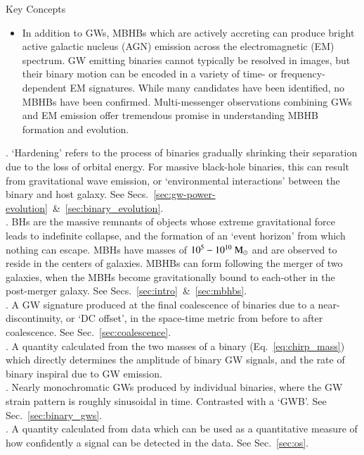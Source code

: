 \documentclass[onecolumn,authoryear]{els-mrw}
\begin{document}
\begin{BoxTypeA}{Key Concepts}
\begin{itemize}
    \item In addition to GWs, MBHBs which are actively accreting can produce bright active galactic nucleus (AGN) emission across the electromagnetic (EM) spectrum.  GW emitting binaries cannot typically be resolved in images, but their binary motion can be encoded in a variety of time- or frequency- dependent EM signatures.  While many candidates have been identified, no MBHBs have been confirmed.  Multi-messenger observations combining GWs and EM emission offer tremendous promise in understanding MBHB formation and evolution.
\end{itemize}
\end{BoxTypeA}


\begin{glossary}[Glossary]
    .  `Hardening' refers to the process of binaries gradually shrinking their separation due to the loss of orbital energy.  For massive black-hole binaries, this can result from gravitational wave emission, or `environmental interactions' between the binary and host galaxy. See Secs.~\ref{sec:gw-power-evolution}~\&~\ref{sec:binary_evolution}. \\
    .  BHs are the massive remnants of objects whose extreme gravitational force leads to indefinite collapse, and the formation of an `event horizon' from which nothing can escape.  MBHs have masses of $10^5 - 10^{10}~\textrm{M}_{\odot}$ and are observed to reside in the centers of galaxies.  MBHBs can form following the merger of two galaxies, when the MBHs become gravitationally bound to each-other in the post-merger galaxy.  See Secs.~\ref{sec:intro}~\&~\ref{sec:mbhbs}. \\
    . A GW signature produced at the final coalescence of binaries due to a near-discontinuity, or `DC offset', in the space-time metric from before to after coalescence. See Sec.~\ref{sec:coalescence}. \\
    .  A quantity calculated from the two masses of a binary (Eq.~\ref{eq:chirp_mass}) which directly determines the amplitude of binary GW signals, and the rate of binary inspiral due to GW emission. \\
    .  Nearly monochromatic GWs produced by individual binaries, where the GW strain pattern is roughly sinusoidal in time.  Contrasted with a `GWB'.  See Sec.~\ref{sec:binary_gws}. \\
    . A quantity calculated from data which can be used as a quantitative measure of how confidently a signal can be detected in the data. See Sec.~\ref{sec:os}. \\

\end{glossary}
\end{document}
